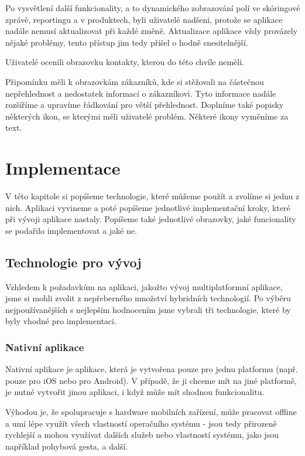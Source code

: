 \documentclass[11pt,twoside,a4paper]{book}
\begin{document}
Po vysvětlení další funkcionality, a to dynamického zobrazování polí ve skóringové zprávě, reportingu a v produktech, byli uživatelé nadšeni, protože se aplikace nadále nemusí aktualizovat při každé změně. Aktualizace aplikace vždy provázely nějaké problémy, tento přístup jim tedy přišel o hodně snesitelnější.

Uživatelé ocenili obrazovku kontakty, kterou do této chvíle neměli. 

Připomínku měli k obrazovkám zákazníků, kde si stěžovali na částečnou nepřehlednost a nedostatek informací o zákazníkovi. Tyto informace nadále rozšíříme a upravíme řádkování pro větší přehlednost. Doplníme také popisky některých ikon, se kterými měli uživatelé problém. Některé ikony vyměníme za text.

\chapter{Implementace}
V této kapitole si popíšeme technologie, které můžeme použít a zvolíme si jednu z nich. Aplikaci vyvineme a poté popíšeme jednotlivé implementační kroky, které při vývoji aplikace nastaly. Popíšeme také jednotlivé obrazovky, jaké funcionality se podařilo implementovat a jaké ne.

\section{Technologie pro vývoj}
Vzhledem k požadavkům na aplikaci, jakožto vývoj multiplatformní aplikace, jsme si mohli zvolit z nepřeberného množství hybridních technologií. Po výběru nejpoužívanějších s nejlepším hodnocením jsme vybrali tři technologie, které by byly vhodné pro implementaci.\cite{hybridniaplikace}

\subsection{Nativní aplikace}
Nativní aplikace je aplikace, která je vytvořena pouze pro jednu platformu (např. pouze pro iOS nebo pro Android). V případě, že ji chceme mít na jiné platformě, je nutné vytvořit jinou aplikaci, i když může mít shodnou funkcionalitu. 

Výhodou je, že spolupracuje s hardware mobilních zařízení, může pracovat offline a umí lépe využít všech vlastností operačního systému - jsou tedy přirozeně rychlejší a mohou využívat dalších služeb nebo vlastností systému, jako jsou například pohybová gesta, a další.
\end{document}
